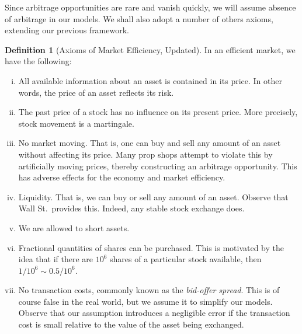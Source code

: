 \documentclass[12pt]{amsbook}
\theoremstyle{plain}
\theoremstyle{definition}
\newtheorem*{definition}{Definition}
\theoremstyle{remark}
\numberwithin{equation}{section}  %
\begin{document}
	Since arbitrage opportunities are rare and vanish quickly, we will assume 
	absence of arbitrage in our models. We shall also adopt a number of others
	axioms, extending our previous framework.
	\begin{definition}[Axioms of Market Efficiency, Updated]
		In an efficient market, we have the following: 
	\begin{enumerate}[(i)]
		\item 
				All available information about an asset is 
				contained in its price. In other words, the price of an asset 
				reflects its risk.
			\item 
				The past price of a stock has no influence on its present price. 
				More precisely,
				stock movement is a martingale.
		\item No market moving. That is, one can buy and sell any amount of an asset
			without affecting its price. Many prop shops attempt to violate this by 
			artificially moving prices, thereby constructing an arbitrage 
			opportunity. This has adverse effects for the economy and market 
			efficiency.   
		\item Liquidity. That is,
			we can buy or sell any amount of an asset. Observe that 
			Wall St.\  provides this. Indeed, any stable stock exchange does. 
		\item We are allowed to short assets.
		\item Fractional quantities of shares can be purchased. This is motivated 
			by the idea that if there are $10^{6}$ shares of a particular stock 
			available, then $1/10^6 \sim 0.5/10^{6}$.
		\item No transaction costs, commonly known as the \emph{bid-offer spread}. 
			This is of course false in the real world, but we assume it to simplify our 
			models. Observe that our assumption introduces a negligible error if the 
			transaction cost is small relative to the value of the asset being 
			exchanged.
	\end{enumerate}
	\end{definition}
\end{document}
